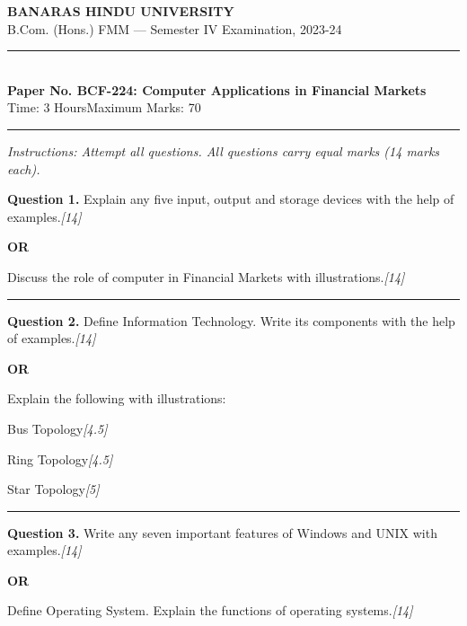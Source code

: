 \documentclass[11pt,a4paper]{article}
\newcommand{\pts}[1]{\hfill   \textit{[#1]}}
\begin{document}
\begin{center}
  {\large\bfseries BANARAS HINDU UNIVERSITY}\\[2pt]
  {\normalsize B.Com. (Hons.) FMM --- Semester IV Examination, 2023-24}\\[6pt]
  \rule{0.8\linewidth}{0.5pt}\\[6pt]
  {\large\bfseries Paper No. BCF-224: Computer Applications in Financial Markets}\\[4pt]
  {\normalsize Time: 3 Hours\hfill Maximum Marks: 70}
\end{center}

\rule{\linewidth}{0.4pt}

\smallskip



\noindent   \textit{Instructions: Attempt all questions. All questions carry equal marks (14 marks each).}

\bigskip




\noindent   \textbf{Question 1.}
Explain any five input, output and storage devices with the help of examples.\pts{14}

\centerline{   \textbf{OR}}

Discuss the role of computer in Financial Markets with illustrations.\pts{14}

\medskip\rule{\linewidth}{0.2pt}




\noindent   \textbf{Question 2.}
Define Information Technology. Write its components with the help of examples.\pts{14}

\centerline{   \textbf{OR}}

Explain the following with illustrations:

\begin{parts}
  \item Bus Topology\pts{4.5}
  \item Ring Topology\pts{4.5}
  \item Star Topology\pts{5}
\end{parts}

\medskip\rule{\linewidth}{0.2pt}




\noindent   \textbf{Question 3.}
Write any seven important features of Windows and UNIX with examples.\pts{14}

\centerline{   \textbf{OR}}

Define Operating System. Explain the functions of operating systems.\pts{14}
\end{document}
